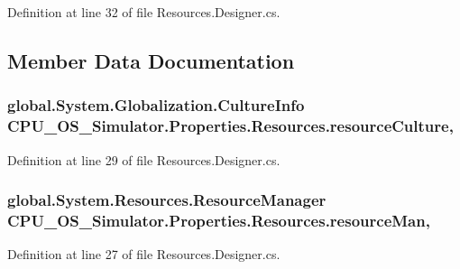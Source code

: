 Definition at line 32 of file Resources.\+Designer.\+cs.



\subsection{Member Data Documentation}
\hypertarget{class_c_p_u___o_s___simulator_1_1_properties_1_1_resources_a08c56eb92abfbde7a18635199c6f28cf}{}
\subsubsection[{resource\+Culture}]{\setlength{\rightskip}{0pt plus 5cm}global.\+System.\+Globalization.\+Culture\+Info C\+P\+U\+\_\+\+O\+S\+\_\+\+Simulator.\+Properties.\+Resources.\+resource\+Culture\hspace{0.3cm}{\ttfamily [static]}, {\ttfamily [private]}}\label{class_c_p_u___o_s___simulator_1_1_properties_1_1_resources_a08c56eb92abfbde7a18635199c6f28cf}


Definition at line 29 of file Resources.\+Designer.\+cs.

\hypertarget{class_c_p_u___o_s___simulator_1_1_properties_1_1_resources_abc80953d3d68ed223e07e8efabc17b79}{}
\subsubsection[{resource\+Man}]{\setlength{\rightskip}{0pt plus 5cm}global.\+System.\+Resources.\+Resource\+Manager C\+P\+U\+\_\+\+O\+S\+\_\+\+Simulator.\+Properties.\+Resources.\+resource\+Man\hspace{0.3cm}{\ttfamily [static]}, {\ttfamily [private]}}\label{class_c_p_u___o_s___simulator_1_1_properties_1_1_resources_abc80953d3d68ed223e07e8efabc17b79}


Definition at line 27 of file Resources.\+Designer.\+cs.



